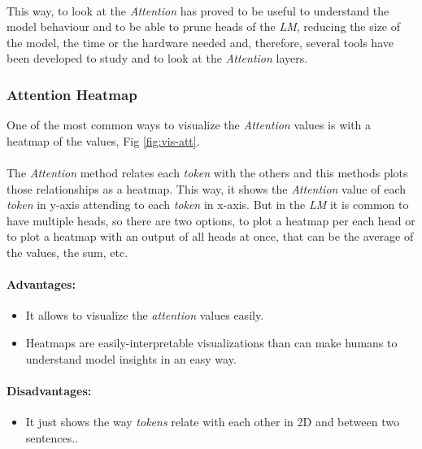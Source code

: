 \paragraph{}
This way, to look at the \emph{Attention} has proved to be useful to understand the model behaviour and to be able to prune heads of the \emph{LM}, reducing the size of the model, the time or the hardware needed and, therefore, several tools have been developed to study and to look at the \emph{Attention} layers.

\subsubsection{Attention Heatmap}
\label{sec:AttentionHeatmap}
\noindent One of the most common ways to visualize the \emph{Attention} values is with a heatmap of the values, Fig \ref{fig:vis-att}.
\paragraph{}
The \emph{Attention} method relates each \emph{token} with the others and this methods plots those relationships as a heatmap. This way, it shows the \emph{Attention} value of each \emph{token} in y-axis attending to each \emph{token} in x-axis. But in the \emph{LM} it is common to have multiple heads, so there are two options, to plot a heatmap per each head or to plot a heatmap with an output of all heads at once, that can be the average of the values, the sum, etc.
\paragraph{Advantages:}
\begin{itemize}
	\item It allows to visualize the \emph{attention} values easily.
	\item Heatmaps are easily-interpretable visualizations than can make humans to understand model insights in an easy way.
\end{itemize}
\paragraph{Disadvantages:}
\begin{itemize}
	\item It just shows the way \emph{tokens} relate with each other in 2D and between two sentences..
\end{itemize}

